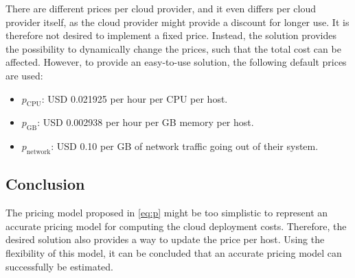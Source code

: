 \noindent 
There are different prices per cloud provider, and it even differs per cloud provider itself, as the cloud provider might provide a discount for longer use. It is therefore not desired to implement a fixed price. Instead, the solution provides the possibility to dynamically change the prices, such that the total cost can be affected. However, to provide an easy-to-use solution, the following default prices are used:
\begin{itemize}
    \item $p_\text{CPU}$: USD 0.021925 per hour per CPU per host.
    \item $p_\text{GB}$: USD 0.002938 per hour per GB memory per host.
    \item $p_\text{network}$: USD 0.10 per GB of network traffic going out of their system.
\end{itemize}

\subsection{Conclusion}
The pricing model proposed in \autoref{eq:p} might be too simplistic to represent an accurate pricing model for computing the cloud deployment costs. Therefore, the desired solution also provides a way to update the price per host. Using the flexibility of this model, it can be concluded that an accurate pricing model can successfully be estimated.



